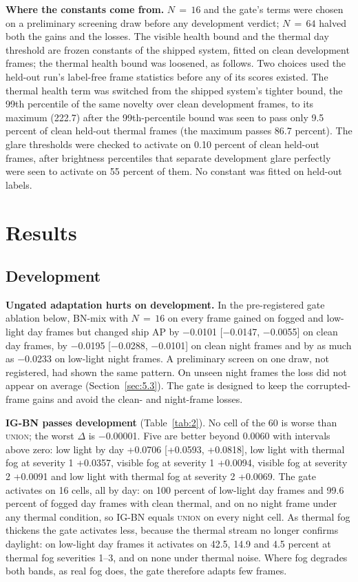 \documentclass[journal]{IEEEtran}
\begin{document}
\textbf{Where the constants come from.} $N\,{=}\,16$ and the gate's terms were chosen on a preliminary screening draw before any development verdict; $N\,{=}\,64$ halved both the gains and the losses. The visible health bound and the thermal day threshold are frozen constants of the shipped system, fitted on clean development frames; the thermal health bound was loosened, as follows. Two choices used the held-out run's label-free frame statistics before any of its scores existed. The thermal health term was switched from the shipped system's tighter bound, the 99th percentile of the same novelty over clean development frames, to its maximum (222.7) after the 99th-percentile bound was seen to pass only 9.5 percent of clean held-out thermal frames (the maximum passes 86.7 percent). The glare thresholds were checked to activate on 0.10 percent of clean held-out frames, after brightness percentiles that separate development glare perfectly were seen to activate on 55 percent of them. No constant was fitted on held-out labels.

\section{Results}\label{sec:5}
\subsection{Development}\label{sec:5.1}
\textbf{Ungated adaptation hurts on development.} In the pre-registered gate ablation below, BN-mix with $N\,{=}\,16$ on every frame gained on fogged and low-light day frames but changed ship AP by $-$0.0101 [$-$0.0147, $-$0.0055] on clean day frames, by $-$0.0195 [$-$0.0288, $-$0.0101] on clean night frames and by as much as $-$0.0233 on low-light night frames. A preliminary screen on one draw, not registered, had shown the same pattern. On unseen night frames the loss did not appear on average (Section~\ref{sec:5.3}). The gate is designed to keep the corrupted-frame gains and avoid the clean- and night-frame losses.

\textbf{IG-BN passes development} (Table~\ref{tab:2}). No cell of the 60 is worse than \textsc{union}; the worst $\Delta$ is $-$0.00001. Five are better beyond 0.0060 with intervals above zero: low light by day +0.0706 [+0.0593, +0.0818], low light with thermal fog at severity 1 +0.0357, visible fog at severity 1 +0.0094, visible fog at severity 2 +0.0091 and low light with thermal fog at severity 2 +0.0069. The gate activates on 16 cells, all by day: on 100 percent of low-light day frames and 99.6 percent of fogged day frames with clean thermal, and on no night frame under any thermal condition, so \mbox{IG-BN} equals \textsc{union} on every night cell. As thermal fog thickens the gate activates less, because the thermal stream no longer confirms daylight: on low-light day frames it activates on 42.5, 14.9 and 4.5 percent at thermal fog severities 1--3, and on none under thermal noise. Where fog degrades both bands, as real fog does, the gate therefore adapts few frames.
\end{document}
